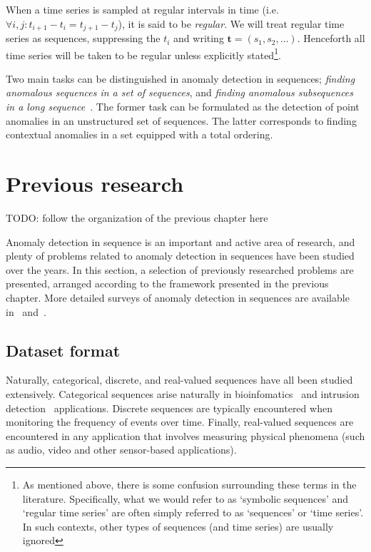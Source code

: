 When a time series is sampled at regular intervals in time (i.e.\ $\forall i, j: t_{i+1} - t_i = t_{j+1} - t_j$), it is said to be \emph{regular}. We will treat regular time series as sequences, suppressing the $t_i$ and writing $\mathbf{t} = (s_1, s_2, \dots)$. Henceforth all time series will be taken to be regular unless explicitly stated\footnote{As mentioned above, there is some confusion surrounding these terms in the literature. Specifically, what we would refer to as `symbolic sequences' and `regular time series' are often simply referred to as `sequences' or `time series'. In such contexts, other types of sequences (and time series) are usually ignored}.

Two main tasks can be distinguished in anomaly detection in sequences; \emph{finding anomalous sequences in a set of sequences}, and \emph{finding anomalous subsequences in a long sequence}~\cite{chandola}. The former task can be formulated as the detection of point anomalies in an unstructured set of sequences. The latter corresponds to finding contextual anomalies in a set equipped with a total ordering.

\section{Previous research}
\label{sect:prev_research}

TODO: follow the organization of the previous chapter here

Anomaly detection in sequence is an important and active area of research, and plenty of problems related to anomaly detection in sequences have been studied over the years. In this section, a selection of previously researched problems are presented, arranged according to the framework presented in the previous chapter. More detailed surveys of anomaly detection in sequences are available in~\cite{chandola} and~\cite{TODO}.

\subsection{Dataset format}

Naturally, categorical, discrete, and real-valued sequences have all been studied extensively. Categorical sequences arise naturally in bioinfomatics~\cite{TODO} and intrusion detection~\cite{TODO} applications. Discrete sequences are typically encountered when monitoring the frequency of events over time. Finally, real-valued sequences are encountered in any application that involves measuring physical phenomena (such as audio, video and other sensor-based applications).

